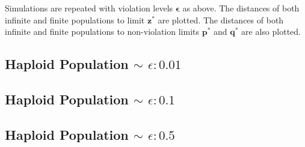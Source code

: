 % 
% 

Simulations are repeated with violation levels $\bm{\epsilon}$ as above.
The distances of both infinite and finite populations to limit $\bm{z}^\ast$ are plotted. 
The distances of both infinite and finite populations to non-violation limits $\bm{p}^\ast$ and $\bm{q}^\ast$ are also plotted.

\subsection{Haploid Population $\mathtt{\sim}$ $\epsilon: 0.01$}

\subsection{Haploid Population $\mathtt{\sim}$ $\epsilon: 0.1$}

\subsection{Haploid Population $\mathtt{\sim}$ $\epsilon: 0.5$}


